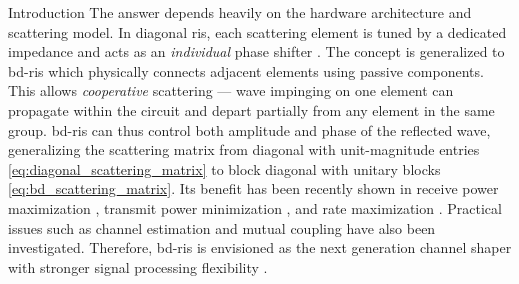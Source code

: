 \begin{section}{Introduction}
	The answer depends heavily on the hardware architecture and scattering model.
	In diagonal \gls{ris}, each scattering element is tuned by a dedicated impedance and acts as an \emph{individual} phase shifter \cite{Wu2020}.
	The concept is generalized to \gls{bd}-\gls{ris} \cite{Shen2020a,Li2023b} which physically connects adjacent elements using passive components.
	This allows \emph{cooperative} scattering --- wave impinging on one element can propagate within the circuit and depart partially from any element in the same group.
	\gls{bd}-\gls{ris} can thus control both amplitude and phase of the reflected wave, generalizing the scattering matrix from diagonal with unit-magnitude entries \eqref{eq:diagonal_scattering_matrix} to block diagonal with unitary blocks \eqref{eq:bd_scattering_matrix}.
	Its benefit has been recently shown in receive power maximization \cite{Nerini2023,Santamaria2023,Fang2023,Nerini2024}, transmit power minimization \cite{Zhou2023}, and rate maximization \cite{Zhou2023,Nerini2024,Li2023d,Bartoli2023,Li2023c}.
	Practical issues such as channel estimation \cite{Li2023e} and mutual coupling \cite{Li2023f} have also been investigated.
	Therefore, \gls{bd}-\gls{ris} is envisioned as the next generation channel shaper with stronger signal processing flexibility \cite{Li2023g}.


\end{section}
